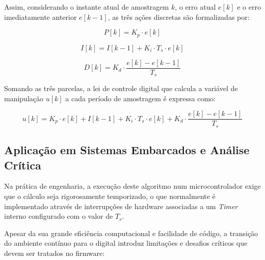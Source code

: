 \documentclass[12pt]{article}
\begin{document}
Assim, considerando o instante atual de amostragem $k$, o erro atual $e[k]$ e o erro imediatamente anterior $e[k-1]$, as três ações discretas são formalizadas por:

\begin{equation}
    P[k] = K_p \cdot e[k]
\end{equation}

\begin{equation}
    I[k] = I[k-1] + K_i \cdot T_s \cdot e[k]
\end{equation}

\begin{equation}
    D[k] = K_d \cdot \frac{e[k] - e[k-1]}{T_s}
\end{equation}

Somando as três parcelas, a lei de controle digital que calcula a variável de manipulação $u[k]$ a cada período de amostragem é expressa como:

\begin{equation}
    u[k] = K_p \cdot e[k] + I[k-1] + K_i \cdot T_s \cdot e[k] + K_d \cdot \frac{e[k] - e[k-1]}{T_s}
\end{equation}

\subsection{Aplicação em Sistemas Embarcados e Análise Crítica}

Na prática de engenharia, a execução deste algoritmo num microcontrolador exige que o cálculo seja rigorosamente temporizado, o que normalmente é implementado através de interrupções de hardware associadas a um \textit{Timer} interno configurado com o valor de $T_s$.

Apesar da sua grande eficiência computacional e facilidade de código, a transição do ambiente contínuo para o digital introduz limitações e desafios críticos que devem ser tratados no firmware:
\end{document}
